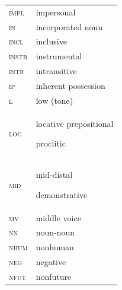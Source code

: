 \documentclass[output=paper]{langsci/langscibook}
\begin{document}
\begin{tabularx}{.45\textwidth}{lX}
\textsc{impl}  &  impersonal \\

\textsc{in}   &  incorporated noun \\

\textsc{incl }  &  inclusive \\

\textsc{instr }  &  instrumental \\

\textsc{intr}  &   intransitive \\

\textsc{ip}  &  inherent possession \\

\textsc{l}  &  low (tone) \\

\textsc{loc}   &  locative prepositional

proclitic \\

\textsc{mid}  &  mid-distal

demonstrative \\

\textsc{mv}  &   middle voice \\

\textsc{nn}  &  noun-noun \\

\textsc{nhum}  &  nonhuman \\

\textsc{neg}  &   negative \\

\textsc{nfut}  &  nonfuture \\
\end{tabularx}
\end{document}

